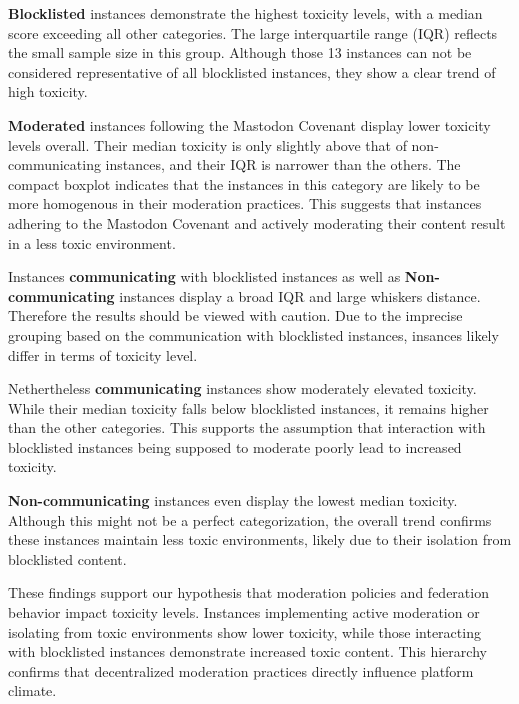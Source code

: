 \textbf{Blocklisted} instances demonstrate the highest toxicity levels, with a median score exceeding all other categories. The large interquartile range (IQR) reflects the small sample size in this group. Although those 13 instances can not be considered representative of all blocklisted instances, they show a clear trend of high toxicity.

\textbf{Moderated} instances following the Mastodon Covenant display lower toxicity levels overall. Their median toxicity is only slightly above that of non-communicating instances, and their IQR is narrower than the others. The compact boxplot indicates that the instances in this category are likely to be more homogenous in their moderation practices. This suggests that instances adhering to the Mastodon Covenant and actively moderating their content result in a less toxic environment.

Instances \textbf{communicating} with blocklisted instances as well as \textbf{Non-communicating} instances display a broad IQR and large whiskers distance. Therefore the results should be viewed with caution. Due to the imprecise grouping based on the communication with blocklisted instances, insances likely differ in terms of toxicity level.

Nethertheless \textbf{communicating} instances show moderately elevated toxicity. While their median toxicity falls below blocklisted instances, it remains higher than the other categories. This supports the assumption that interaction with blocklisted instances being supposed to moderate poorly lead to increased toxicity. 

\textbf{Non-communicating} instances even display the lowest median toxicity. Although this might not be a perfect categorization, the overall trend confirms these instances maintain less toxic environments, likely due to their isolation from blocklisted content.

These findings support our hypothesis that moderation policies and federation behavior impact toxicity levels. Instances implementing active moderation or isolating from toxic environments show lower toxicity, while those interacting with blocklisted instances demonstrate increased toxic content. This hierarchy confirms that decentralized moderation practices directly influence platform climate.
